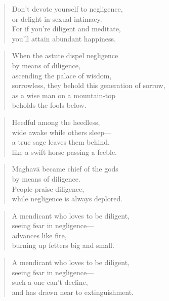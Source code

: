 \documentclass[12pt,openany]{book}%
\begin{document}
\begin{verse}%
Don’t devote yourself to negligence, \\
or delight in sexual intimacy. \\
For if you’re diligent and meditate, \\
you’ll attain abundant happiness. 

%
\end{verse}

\begin{verse}%
When the astute dispel negligence \\
by means of diligence, \\
ascending the palace of wisdom, \\
sorrowless, they behold this generation of sorrow, \\
as a wise man on a mountain-top \\
beholds the fools below. 

%
\end{verse}

\begin{verse}%
Heedful among the heedless, \\
wide awake while others sleep—\\
a true sage leaves them behind, \\
like a swift horse passing a feeble. 

%
\end{verse}

\begin{verse}%
\textsanskrit{Maghavā} became chief of the gods \\
by means of diligence. \\
People praise diligence, \\
while negligence is always deplored. 

%
\end{verse}

\begin{verse}%
A mendicant who loves to be diligent, \\
seeing fear in negligence—\\
advances like fire, \\
burning up fetters big and small. 

%
\end{verse}

\begin{verse}%
A mendicant who loves to be diligent, \\
seeing fear in negligence—\\
such a one can’t decline, \\
and has drawn near to extinguishment. 

%
\end{verse}
\end{document}
